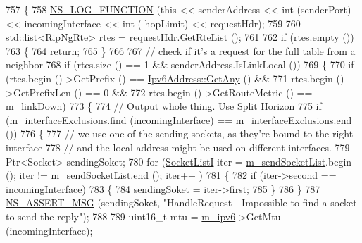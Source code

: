 \begin{DoxyCode}
757 \{
758   \hyperlink{log-macros-disabled_8h_a90b90d5bad1f39cb1b64923ea94c0761}{NS\_LOG\_FUNCTION} (\textcolor{keyword}{this} << senderAddress << \textcolor{keywordtype}{int} (senderPort) << incomingInterface << \textcolor{keywordtype}{int} (
      hopLimit) << requestHdr);
759 
760   std::list<RipNgRte> rtes = requestHdr.GetRteList ();
761 
762   \textcolor{keywordflow}{if} (rtes.empty ())
763     \{
764       \textcolor{keywordflow}{return};
765     \}
766 
767   \textcolor{comment}{// check if it's a request for the full table from a neighbor}
768   \textcolor{keywordflow}{if} (rtes.size () == 1 && senderAddress.IsLinkLocal ())
769     \{
770       \textcolor{keywordflow}{if} (rtes.begin ()->GetPrefix () == \hyperlink{classns3_1_1Ipv6Address_a2783e8badfc98c8b0a8508bba6e1b91e}{Ipv6Address::GetAny} () &&
771           rtes.begin ()->GetPrefixLen () == 0 &&
772           rtes.begin ()->GetRouteMetric () == \hyperlink{classns3_1_1RipNg_a6752c1bb1fc0909f0493033d426f2b92}{m\_linkDown})
773         \{
774           \textcolor{comment}{// Output whole thing. Use Split Horizon}
775           \textcolor{keywordflow}{if} (\hyperlink{classns3_1_1RipNg_a98c5b63bb7c56afa595c1bb568a7081f}{m\_interfaceExclusions}.find (incomingInterface) == 
      \hyperlink{classns3_1_1RipNg_a98c5b63bb7c56afa595c1bb568a7081f}{m\_interfaceExclusions}.end ())
776             \{
777               \textcolor{comment}{// we use one of the sending sockets, as they're bound to the right interface}
778               \textcolor{comment}{// and the local address might be used on different interfaces.}
779               Ptr<Socket> sendingSoket;
780               \textcolor{keywordflow}{for} (\hyperlink{classns3_1_1RipNg_a549052bbb55168d029f82d78384144b4}{SocketListI} iter = \hyperlink{classns3_1_1RipNg_a761d304dc3d34cd528afe87c5fa8090b}{m\_sendSocketList}.begin (); iter != 
      \hyperlink{classns3_1_1RipNg_a761d304dc3d34cd528afe87c5fa8090b}{m\_sendSocketList}.end (); iter++ )
781                 \{
782                   \textcolor{keywordflow}{if} (iter->second == incomingInterface)
783                     \{
784                       sendingSoket = iter->first;
785                     \}
786                 \}
787               \hyperlink{assert_8h_aff5ece9066c74e681e74999856f08539}{NS\_ASSERT\_MSG} (sendingSoket, \textcolor{stringliteral}{"HandleRequest - Impossible to find a socket to
       send the reply"});
788 
789               uint16\_t mtu = \hyperlink{classns3_1_1RipNg_aca7a023799ce2004499a826ba5d5d3fe}{m\_ipv6}->GetMtu (incomingInterface);

\end{DoxyCode}

